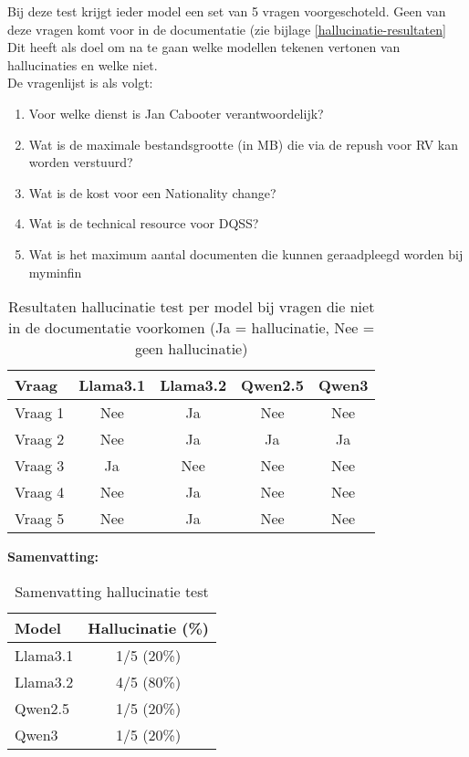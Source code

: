 Bij deze test krijgt ieder model een set van 5 vragen voorgeschoteld. Geen van deze vragen komt voor in de documentatie (zie bijlage \ref{hallucinatie-resultaten} Dit heeft als doel om na te gaan welke modellen tekenen vertonen van hallucinaties en welke niet. 
\\[1em]
De vragenlijst is als volgt:

\begin{enumerate}
    \item Voor welke dienst is Jan Cabooter verantwoordelijk?
    \item Wat is de maximale bestandsgrootte (in MB) die via de repush voor RV kan worden verstuurd?
    \item Wat is de kost voor een Nationality change?
    \item Wat is de technical resource voor DQSS?
    \item Wat is het maximum aantal documenten die kunnen geraadpleegd worden bij myminfin
\end{enumerate}

\begin{table}[H]
    \begin{tabular}{|l|c|c|c|c|}
        \hline
        \textbf{Vraag} & \textbf{Llama3.1} & \textbf{Llama3.2} & \textbf{Qwen2.5} & \textbf{Qwen3} \\
        \hline
       Vraag 1 & Nee & Ja & Nee & Nee \\
       Vraag 2 & Nee & Ja & Ja & Ja \\
       Vraag 3 & Ja & Nee & Nee & Nee \\
       Vraag 4 & Nee & Ja & Nee & Nee \\
       Vraag 5 & Nee & Ja & Nee & Nee \\
        \hline
    \end{tabular}
    \caption{Resultaten hallucinatie test per model bij vragen die niet in de documentatie voorkomen (Ja = hallucinatie, Nee = geen hallucinatie)}
\end{table}

\noindent\textbf{Samenvatting:}  
\begin{table}[H]
    \begin{tabular}{|l|c|}
        \hline
        \textbf{Model} & \textbf{Hallucinatie (\%)} \\
        \hline
        Llama3.1 & 1/5 (20\%) \\
        Llama3.2 & 4/5 (80\%) \\
        Qwen2.5  & 1/5 (20\%) \\
        Qwen3    & 1/5 (20\%) \\
        \hline
    \end{tabular}
    \caption{Samenvatting hallucinatie test}
\end{table}


